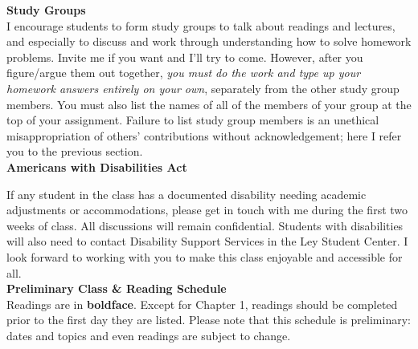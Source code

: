 \documentclass [11pt]{article}
\begin{document}
{\bf Study Groups}\\

I encourage students to form study groups to talk about readings and lectures, and especially to discuss and work through understanding how to solve homework problems.  Invite me if you want and I'll try to come.  However, after you figure/argue them out together, \emph{you must do the work and type up your homework answers entirely on your own}, separately from the other study group members.  You must also list the names of all of the members of your group at the top of your assignment.  Failure to list study group members is an unethical misappropriation of others' contributions without acknowledgement;  here I refer you to the previous section.\\

 {\bf Americans with Disabilities Act}
 
 If any student in the class has a documented disability needing academic adjustments or accommodations, please get in touch with me during the first two weeks of class.  All discussions will remain confidential.  Students with disabilities will also need to contact Disability Support Services in the Ley Student Center.  I look forward to working with you to make this class enjoyable and accessible for all. \ \\

\pagebreak{}
{\bf  Preliminary Class \& Reading Schedule }\\
Readings are in \textbf{boldface}.  Except for Chapter 1, readings should be completed prior to the first day they are listed.  Please note that this schedule is preliminary: dates and topics and even readings are subject to change.
\end{document}
